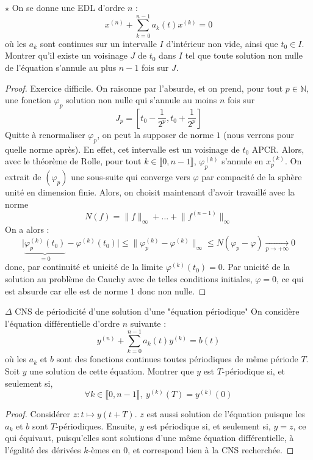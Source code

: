 \documentclass[french,a4paper]{article}
\newcommand{\N}{\mathbb{N}}
\theoremstyle{plain}
\theoremstyle{definition}
\theoremstyle{remark}
\begin{document}
\begin{ex}[Moulin.52]{$\star$}
	On se donne une EDL d'ordre $n$ : $$x^{(n)}+\sum_{k=0}^{n-1}a_k(t)x^{(k)}=0$$ où les $a_k$ sont continues sur un intervalle $I$ d'intérieur non vide, ainsi que $t_0\in I$. Montrer qu'il existe un voisinage $J$ de $t_0$ dans $I$ tel que toute solution non nulle de l'équation s'annule au plus $n-1$ fois sur $J$.
\end{ex}
\begin{proof}
	Exercice difficile. On raisonne par l'absurde, et on prend, pour tout $p\in\N$, une fonction $\varphi_p$ solution non nulle qui s'annule au moins $n$ fois sur $$J_p=\left[t_0-\frac{1}{2^p},t_0+\frac{1}{2^p}\right]$$ Quitte à renormaliser $\varphi_p$, on peut la supposer de norme $1$ (nous verrons pour quelle norme après). En effet, cet intervalle est un voisinage de $t_0$ APCR. Alors, avec le théorème de Rolle, pour tout $k\in\llbracket0,n-1\rrbracket$, $\varphi_p^{(k)}$ s'annule en $x_p^{(k)}$. On extrait de $(\varphi_p)$ une sous-suite qui converge vers $\varphi$ par compacité de la sphère unité en dimension finie. Alors, on choisit maintenant d'avoir travaillé avec la norme $$N(f)=\lVert f\rVert_\infty+\ldots+\lVert f^{(n-1)}\rVert_\infty$$ On a alors : $$\lvert \underbrace{\varphi_p^{(k)}(t_0)}_{=0}-\varphi^{(k)}(t_0)\rvert \leqslant \lVert \varphi_p^{(k)}-\varphi^{(k)}\rVert_\infty\leqslant N(\varphi_p-\varphi)\xrightarrow[p\to+\infty]{}0$$ donc, par continuité et unicité de la limite $\varphi^{(k)}(t_0)=0$. Par unicité de la solution au problème de Cauchy avec de telles conditions initiales, $\varphi=0$, ce qui est absurde car elle est de norme $1$ donc non nulle.
\end{proof}

\begin{ex}{$\Delta$ CNS de périodicité d'une solution d'une "équation périodique"}
	On considère l'équation différentielle d'ordre $n$ suivante : $$y^{(n)}+\sum_{k=0}^{n-1}a_k(t)y^{(k)}=b(t)$$ où les $a_k$ et $b$ sont des fonctions continues toutes périodiques de même période $T$. Soit $y$ une solution de cette équation. Montrer que $y$ est $T$-périodique si, et seulement si, $$\forall k\in\llbracket0,n-1\rrbracket,\ y^{(k)}(T)=y^{(k)}(0)$$
\end{ex}
\begin{proof}
	Considérer $z:t\mapsto y(t+T)$. $z$ est aussi solution de l'équation puisque les $a_k$ et $b$ sont $T$-périodiques. Ensuite, $y$ est périodique si, et seulement si, $y=z$, ce qui équivaut, puisqu'elles sont solutions d'une même équation différentielle, à l'égalité des dérivées $k$-èmes en $0$, et correspond bien à la CNS recherchée.
\end{proof}
\end{document}
